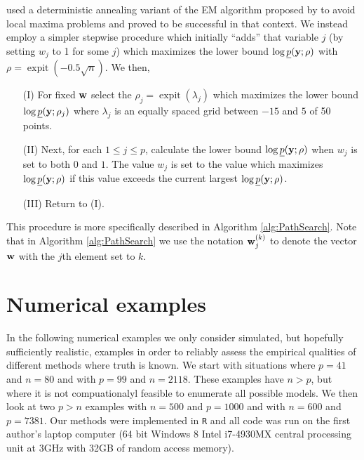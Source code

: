 \documentclass[11pt]{article}
\newtheorem{Main Result}{Main Result}
\def\vectorfontone{\bf}
\def\vw{{\vectorfontone w}}                      %
\def\vy{{\vectorfontone y}}                      %
\DeclareMathOperator{\expit}{expit}
\newcommand{\joc}[1]{{\color{black}#1}}
\begin{document}
\cite{Rockova2014} used a deterministic annealing variant of the EM
algorithm proposed by \cite{UedaNakano1998} to avoid local maxima
problems and proved to be successful in that context. We instead employ a
simpler stepwise procedure which initially  ``adds'' that variable
$j$ (by setting $w_j$ to 1 for some $j$) which maximizes the lower bound
$\log\underline{p}(\vy;\rho)$ with $\rho = \expit(- 0.5\sqrt{n})$. We then,
\begin{enumerate}
\item[(I)] For fixed $\vw$ select the
$\rho_j=\expit(\lambda_j)$ which maximizes the lower bound
$\log\underline{p}(\vy;\rho_j)$
where $\lambda_j$ is an equally spaced
grid between $-15$ and $5$ of 50 points.

\item[(II)] Next, for each $1\le j\le p$, calculate the lower bound
$\log\underline{p}(\vy;\rho)$ when $w_j$ is set to both $0$ and $1$.
The value $w_j$ is set to the value which maximizes
$\log\underline{p}(\vy;\rho)$ if this value exceeds the current largest
$\log\underline{p}(\vy;\rho)$.

\item[(III)] Return to (I).
\end{enumerate}

\noindent This procedure is more specifically described in Algorithm
\ref{alg:PathSearch}. Note that in Algorithm \joc{\ref{alg:PathSearch}} we
use the notation
$\vw_j^{(k)}$ to
denote the vector $\vw$ with the $j$th
element set to $k$.
 


\section{Numerical examples}
\label{sec:Numerical Examples}

In the following numerical examples we only consider simulated, but
hopefully sufficiently realistic, examples in order to reliably assess the empirical
qualities of different methods where truth is known.
We start with situations where $p=41$ and $n=80$ and with $p=99$ and $n=2118$. These
examples have $n>p$, but where it is not compuationalyl feasible to enumerate all
possible models. We then look at two $p>n$ examples with $n=500$ and $p=1000$ and
with $n=600$ and $p=7381$. Our methods were implemented in {\tt R}
and all code was run on the first author's laptop computer (64 bit Windows 8 Intel
i7-4930MX central processing unit at 3GHz with 32GB of random access memory).
\end{document}
